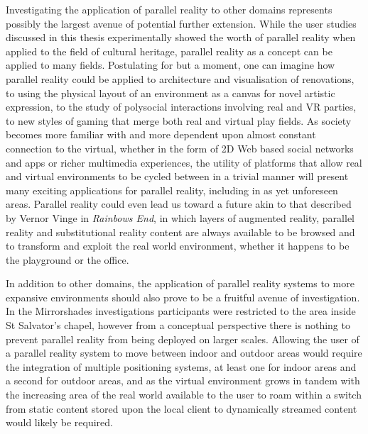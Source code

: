 Investigating the application of parallel reality to other domains represents possibly the largest avenue of potential further extension. While the user studies discussed in this thesis experimentally showed the worth of parallel reality when applied to the field of cultural heritage, parallel reality as a concept can be applied to many fields. Postulating for but a moment, one can imagine how parallel reality could be applied to architecture and visualisation of renovations, to using the physical layout of an environment as a canvas for novel artistic expression, to the study of polysocial interactions involving real and VR parties, to new styles of gaming that merge both real and virtual play fields. As society becomes more familiar with and more dependent upon almost constant connection to the virtual, whether in the form of 2D Web based social networks and apps or richer multimedia experiences, the utility of platforms that allow real and virtual environments to be cycled between in a trivial manner will present many exciting applications for parallel reality, including in as yet unforeseen areas. Parallel reality could even lead us toward a future akin to that described by Vernor Vinge in \textit{Rainbows End}, in which layers of augmented reality, parallel reality and substitutional reality content are always available to be browsed and to transform and exploit the real world environment, whether it happens to be the playground or the office.

In addition to other domains, the application of parallel reality systems to more expansive environments should also prove to be a fruitful avenue of investigation. In the Mirrorshades investigations participants were restricted to the area inside St Salvator's chapel, however from a conceptual perspective there is nothing to prevent parallel reality from being deployed on larger scales. Allowing the user of a parallel reality system to move between indoor and outdoor areas would require the integration of multiple positioning systems, at least one for indoor areas and a second for outdoor areas, and as the virtual environment grows in tandem with the increasing area of the real world available to the user to roam within a switch from static content stored upon the local client to dynamically streamed content would likely be required.

